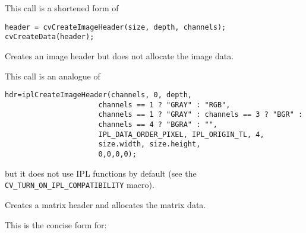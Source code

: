 This call is a shortened form of
\begin{lstlisting}
header = cvCreateImageHeader(size, depth, channels);
cvCreateData(header);
\end{lstlisting}


Creates an image header but does not allocate the image data.


\begin{description}
\end{description}

This call is an analogue of
\begin{lstlisting}
hdr=iplCreateImageHeader(channels, 0, depth,
                      channels == 1 ? "GRAY" : "RGB",
                      channels == 1 ? "GRAY" : channels == 3 ? "BGR" :
                      channels == 4 ? "BGRA" : "",
                      IPL_DATA_ORDER_PIXEL, IPL_ORIGIN_TL, 4,
                      size.width, size.height,
                      0,0,0,0);
\end{lstlisting}
but it does not use IPL functions by default (see the \texttt{CV\_TURN\_ON\_IPL\_COMPATIBILITY} macro).

\label{cvCreateMat}
Creates a matrix header and allocates the matrix data. 


\begin{description}
\end{description}

This is the concise form for:

